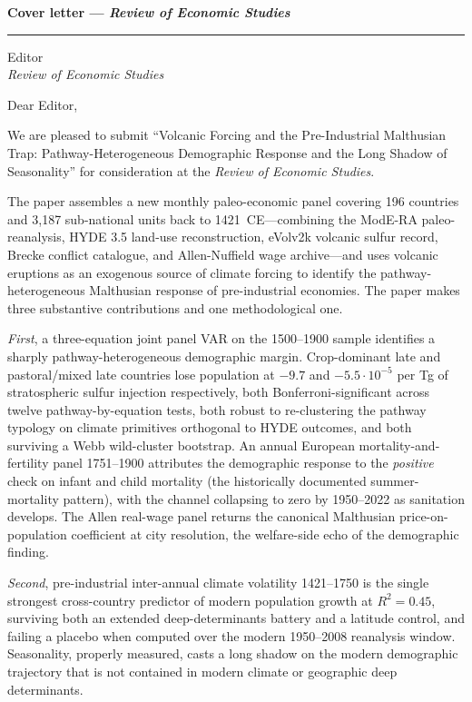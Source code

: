\documentclass[11pt,letterpaper]{article}
\begin{document}
\noindent\textbf{Cover letter --- \emph{Review of Economic Studies}}\\[0.4em]
\textcolor{mutedgray}{\rule{0.22\linewidth}{0.4pt}}

\bigskip
\noindent Editor\\
\textit{Review of Economic Studies}

\bigskip

\noindent Dear Editor,

\bigskip

\noindent We are pleased to submit ``Volcanic Forcing and the Pre-Industrial Malthusian Trap: Pathway-Heterogeneous Demographic Response and the Long Shadow of Seasonality'' for consideration at the \emph{Review of Economic Studies}.

The paper assembles a new monthly paleo-economic panel covering 196 countries and 3{,}187 sub-national units back to 1421~CE---combining the ModE-RA paleo-reanalysis, HYDE 3.5 land-use reconstruction, eVolv2k volcanic sulfur record, Brecke conflict catalogue, and Allen-Nuffield wage archive---and uses volcanic eruptions as an exogenous source of climate forcing to identify the pathway-heterogeneous Malthusian response of pre-industrial economies. The paper makes three substantive contributions and one methodological one.

\emph{First}, a three-equation joint panel VAR on the 1500--1900 sample identifies a sharply pathway-heterogeneous demographic margin. Crop-dominant late and pastoral/mixed late countries lose population at $-9.7$ and $-5.5\!\cdot\!10^{-5}$ per Tg of stratospheric sulfur injection respectively, both Bonferroni-significant across twelve pathway-by-equation tests, both robust to re-clustering the pathway typology on climate primitives orthogonal to HYDE outcomes, and both surviving a Webb wild-cluster bootstrap. An annual European mortality-and-fertility panel 1751--1900 attributes the demographic response to the \emph{positive} check on infant and child mortality (the historically documented summer-mortality pattern), with the channel collapsing to zero by 1950--2022 as sanitation develops. The Allen real-wage panel returns the canonical Malthusian price-on-population coefficient at city resolution, the welfare-side echo of the demographic finding.

\emph{Second}, pre-industrial inter-annual climate volatility 1421--1750 is the single strongest cross-country predictor of modern population growth at $R^2 = 0.45$, surviving both an extended deep-determinants battery and a latitude control, and failing a placebo when computed over the modern 1950--2008 reanalysis window. Seasonality, properly measured, casts a long shadow on the modern demographic trajectory that is not contained in modern climate or geographic deep determinants.
\end{document}
